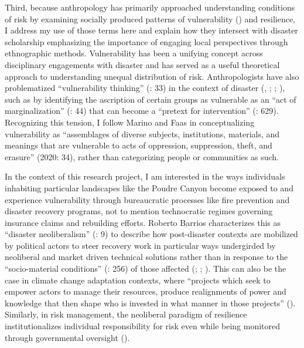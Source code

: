 \documentclass[
]{article}
\begin{document}
Third, because anthropology has primarily approached understanding conditions of risk by examining socially produced patterns of vulnerability () and resilience, I address my use of those terms here and explain how they intersect with disaster scholarship emphasizing the importance of engaging local perspectives through ethnographic methods. Vulnerability has been a unifying concept across disciplinary engagements with disaster and has served as a useful theoretical approach to understanding unequal distribution of risk. Anthropologists have also problematized ``vulnerability thinking'' (: 33) in the context of disaster (, ; ; ), such as by identifying the ascription of certain groups as vulnerable as an ``act of marginalization'' (: 44) that can become a ``pretext for intervention'' (: 629). Recognizing this tension, I follow Marino and Faas in conceptualizing vulnerability as ``assemblages of diverse subjects, institutions, materials, and meanings that are vulnerable to acts of oppression, suppression, theft, and erasure'' (2020: 34), rather than categorizing people or communities as such.

In the context of this research project, I am interested in the ways individuals inhabiting particular landscapes like the Poudre Canyon become exposed to and experience vulnerability through bureaucratic processes like fire prevention and disaster recovery programs, not to mention technocratic regimes governing insurance claims and rebuilding efforts. Roberto Barrios characterizes this as ``disaster neoliberalism'' (: 9) to describe how post-disaster contexts are mobilized by political actors to steer recovery work in particular ways undergirded by neoliberal and market driven technical solutions rather than in response to the ``socio-material conditions'' (: 256) of those affected (; ; ). This can also be the case in climate change adaptation contexts, where ``projects which seek to empower actors to manage their resources, produce realignments of power and knowledge that then shape who is invested in what manner in those projects'' (). Similarly, in risk management, the neoliberal paradigm of resilience institutionalizes individual responsibility for risk even while being monitored through governmental oversight ().
\end{document}
